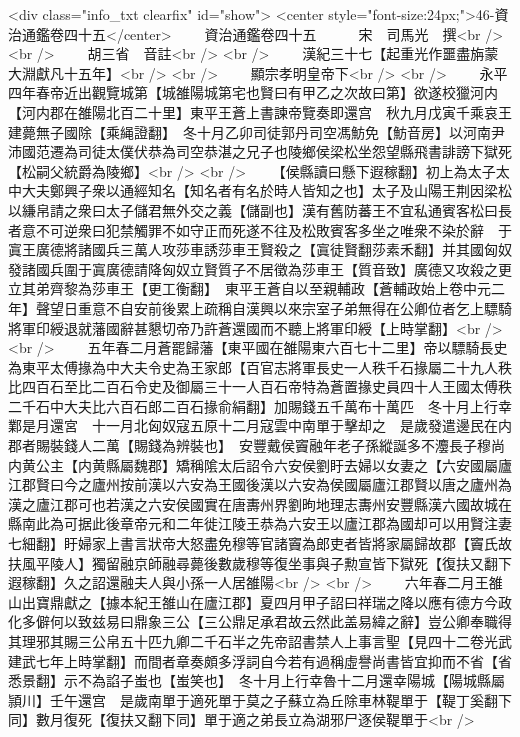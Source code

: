 <div class="info_txt clearfix" id="show">
<center style="font-size:24px;">46-資治通鑑卷四十五</center>
  　　資治通鑑卷四十五　　　宋　司馬光　撰<br />
<br />
　　胡三省　音註<br />
<br />
　　漢紀三十七【起重光作噩盡旃蒙大淵獻凡十五年】<br />
<br />
　　顯宗孝明皇帝下<br />
<br />
　　永平四年春帝近出觀覽城第【城雒陽城第宅也賢曰有甲乙之次故曰第】欲遂校獵河内【河内郡在雒陽北百二十里】東平王蒼上書諫帝覽奏即還宫　秋九月戊寅千乘哀王建薨無子國除【乘䋲證翻】　冬十月乙卯司徒郭丹司空馮魴免【魴音房】以河南尹沛國范遷為司徒太僕伏恭為司空恭湛之兄子也陵鄉侯梁松坐怨望縣飛書誹謗下獄死【松嗣父統爵為陵鄉】<br />
<br />
　　【侯縣讀曰懸下遐稼翻】初上為太子太中大夫鄭興子衆以通經知名【知名者有名於時人皆知之也】太子及山陽王荆因梁松以縑帛請之衆曰太子儲君無外交之義【儲副也】漢有舊防蕃王不宜私通賓客松曰長者意不可逆衆曰犯禁觸罪不如守正而死遂不往及松敗賓客多坐之唯衆不染於辭　于寘王廣德將諸國兵三萬人攻莎車誘莎車王賢殺之【寘徒賢翻莎素禾翻】并其國匈奴發諸國兵圍于寘廣德請降匈奴立賢質子不居徵為莎車王【質音致】廣德又攻殺之更立其弟齊黎為莎車王【更工衡翻】　東平王蒼自以至親輔政【蒼輔政始上卷中元二年】聲望日重意不自安前後累上疏稱自漢興以來宗室子弟無得在公卿位者乞上驃騎將軍印綬退就藩國辭甚懇切帝乃許蒼還國而不聽上將軍印綬【上時掌翻】<br />
<br />
　　五年春二月蒼罷歸藩【東平國在雒陽東六百七十二里】帝以驃騎長史為東平太傅掾為中大夫令史為王家郎【百官志將軍長史一人秩千石掾屬二十九人秩比四百石至比二百石令史及御屬三十一人百石帝特為蒼置掾史員四十人王國太傅秩二千石中大夫比六百石郎二百石掾俞絹翻】加賜錢五千萬布十萬匹　冬十月上行幸鄴是月還宮　十一月北匈奴寇五原十二月寇雲中南單于擊却之　是歲發遣邊民在内郡者賜裝錢人二萬【賜錢為辨裝也】　安豐戴侯竇融年老子孫縱誕多不灋長子穆尚内黄公主【内黄縣屬魏郡】矯稱隂太后詔令六安侯劉盱去婦以女妻之【六安國屬廬江郡賢曰今之廬州按前漢以六安為王國後漢以六安為侯國屬廬江郡賢以唐之廬州為漢之廬江郡可也若漢之六安侯國實在唐夀州界劉昫地理志夀州安豐縣漢六國故城在縣南此為可据此後章帝元和二年徙江陵王恭為六安王以廬江郡為國却可以用賢注妻七細翻】盱婦家上書言狀帝大怒盡免穆等官諸竇為郎吏者皆將家屬歸故郡【竇氏故扶風平陵人】獨留融京師融尋薨後數歲穆等復坐事與子勲宣皆下獄死【復扶又翻下遐稼翻】久之詔還融夫人與小孫一人居雒陽<br />
<br />
　　六年春二月王雒山出寶鼎獻之【據本紀王雒山在廬江郡】夏四月甲子詔曰祥瑞之降以應有德方今政化多僻何以致兹易曰鼎象三公【三公鼎足承君故云然此盖易緯之辭】豈公卿奉職得其理邪其賜三公帛五十匹九卿二千石半之先帝詔書禁人上事言聖【見四十二卷光武建武七年上時掌翻】而間者章奏頗多浮詞自今若有過稱虛譽尚書皆宜抑而不省【省悉景翻】示不為諂子蚩也【蚩笑也】　冬十月上行幸魯十二月還幸陽城【陽城縣屬頴川】壬午還宫　是歲南單于適死單于莫之子蘇立為丘除車林鞮單于【鞮丁奚翻下同】數月復死【復扶又翻下同】單于適之弟長立為湖邪尸逐侯鞮單于<br />
